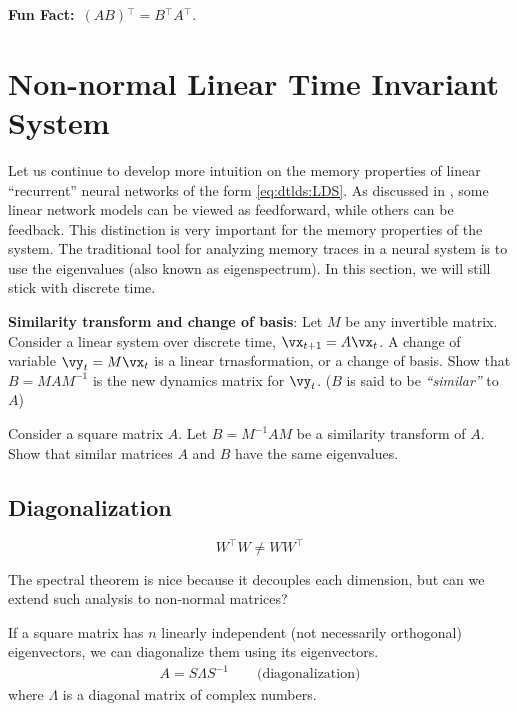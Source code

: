 \documentclass[a4paper,11pt]{exam}
\newcounter{ct}
\newcommand{\inv}{^{-1}}
\newcommand{\trp}{{^\top}} %
\newcommand{\funfact}{\textbf{Fun Fact:}~}
\begin{document}
\begin{questions}
\begin{tcolorbox}
    \funfact $(AB)\trp = B\trp A\trp$.
\end{tcolorbox}

\clearpage
\section{Non-normal Linear Time Invariant System}
Let us continue to develop more intuition on the memory properties of linear ``recurrent'' neural networks of the form \eqref{eq:dtlds:LDS}.
As discussed in \citet{Goldman2009}, some linear network models can be viewed as feedforward, while others can be feedback.
This distinction is very important for the memory properties of the system.
The traditional tool for analyzing memory traces in a neural system is to use the eigenvalues (also known as eigenspectrum).
In this section, we will still stick with discrete time.

\question \textbf{Similarity transform and change of basis}:
Let $M$ be any invertible matrix.
Consider a linear system over discrete time, $\vx_{t+1} = A\vx_t$.
A change of variable $\vy_t = M\vx_t$ is a linear trnasformation, or a change of basis.
Show that $B = M A M\inv$ is the new dynamics matrix for $\vy_t$.
($B$ is said to be \textit{``similar''} to $A$)

\question Consider a square matrix $A$. Let $B = M\inv A M$ be a similarity transform of $A$.
Show that similar matrices $A$ and $B$ have the same eigenvalues.


\subsection{Diagonalization}
\begin{tcolorbox}[colback=black!1!,title=Non-normal matrices]
    $$W\trp W \neq W W\trp$$
\end{tcolorbox}
The spectral theorem is nice because it decouples each dimension, but can we extend such analysis to non-normal matrices?
\begin{tcolorbox}[colback=black!1!,title=Diagonalization]
If a square matrix has $n$ linearly independent (not necessarily orthogonal) eigenvectors, we can diagonalize them using its eigenvectors.
\begin{align}\label{eq:eigendecomposition}
A = S \Lambda S\inv  \qquad \text{(diagonalization)}
\end{align}
where $\Lambda$ is a diagonal matrix of complex numbers.
\end{tcolorbox}


\end{questions}
\end{document}
